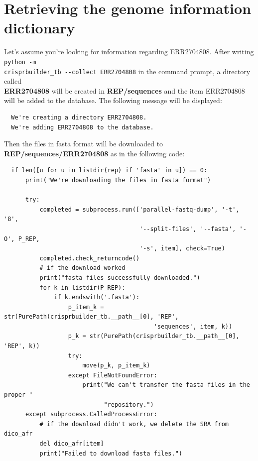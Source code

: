 \documentclass[twoside,a4paper,11pt,frenchb,openany]{report}
\begin{document}
    \section{Retrieving the genome information
dictionary}\label{retrieving-the-genome-information-dictionary}

    Let's assume you're looking for information regarding ERR2704808. After
writing \texttt{python\ -m\ \\crisprbuilder\_tb\ -\/-collect\ ERR2704808}
in the command prompt, a directory called\\ \textbf{ERR2704808} will be
created in \textbf{REP/sequences} and the item ERR2704808 will be added
to the database. The following message will be displayed:

    \begin{verbatim}
  We're creating a directory ERR2704808.
  We're adding ERR2704808 to the database.
\end{verbatim}

    Then the files in fasta format will be downloaded to
\textbf{REP/sequences/ERR2704808} as in the following code:

\begin{verbatim}
  if len([u for u in listdir(rep) if 'fasta' in u]) == 0:
      print("We're downloading the files in fasta format")

      try:
          completed = subprocess.run(['parallel-fastq-dump', '-t', '8',
                                      '--split-files', '--fasta', '-O', P_REP,
                                      '-s', item], check=True)
          completed.check_returncode()
          # if the download worked
          print("fasta files successfully downloaded.")
          for k in listdir(P_REP):
              if k.endswith('.fasta'):
                  p_item_k = str(PurePath(crisprbuilder_tb.__path__[0], 'REP',
                                          'sequences', item, k))
                  p_k = str(PurePath(crisprbuilder_tb.__path__[0], 'REP', k))
                  try:
                      move(p_k, p_item_k)
                  except FileNotFoundError:
                      print("We can't transfer the fasta files in the proper "
                            "repository.")
      except subprocess.CalledProcessError:
          # if the download didn't work, we delete the SRA from dico_afr
          del dico_afr[item]
          print("Failed to download fasta files.")
\end{verbatim}
\end{document}
